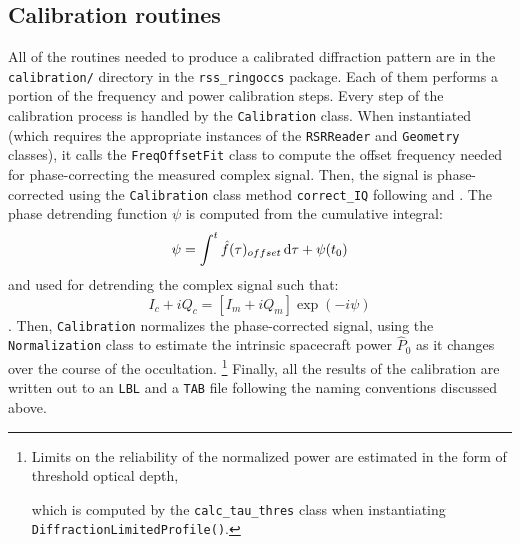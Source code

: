 \documentclass[titlepage, 12pt]{article}
\begin{document}
    \subsection{Calibration routines}\label{sec:calroutines}
            All of the routines needed to produce a calibrated diffraction
            pattern are in the \texttt{calibration/} directory in the
            \texttt{rss\_ringoccs} package. Each of them performs a
            portion of the frequency and power calibration steps. Every step
            of the calibration process is handled by the \texttt{Calibration}
            class. When instantiated (which requires the appropriate instances
            of the \texttt{RSRReader} and \texttt{Geometry} classes), it calls
            the \texttt{FreqOffsetFit} class to compute the offset frequency
            needed for phase-correcting the measured complex signal. Then, the
            signal is phase-corrected using the \texttt{Calibration} class
            method \texttt{correct\_IQ} following \citet{Marouf1986} and
            \citet{CRSUG2018}. The phase detrending function $\psi$ is
            computed from the cumulative integral:
            \begin{equation}
                \psi=\int^{t}\hat{f}(\tau)_{offset}\mathop{}\!\mathrm{d}{\tau}+\psi(t_0)
            \end{equation}
            and used for detrending the complex signal such that:
            \begin{equation}
                I_{c}+iQ_{c}=[I_{m}+iQ_{m}]\exp(-i\psi)
            \end{equation}
            \citep[Equations 17 and 18]{CRSUG2018}.
            Then, \texttt{Calibration} normalizes the phase-corrected signal,
            using the \texttt{Normalization} class to estimate the intrinsic
            spacecraft power $\hat{P}_0$ as it changes over the course of the
            occultation.%
            \footnote{Limits on the reliability of the normalized
                      power are estimated in the form of threshold
                      optical depth,
                      \par\hspace{1.3ex}
                      which is computed by the
                      \texttt{calc\_tau\_thres} class when instantiating
                      \texttt{DiffractionLimitedProfile()}.}
            Finally, all the results of the calibration are written out to
            an \texttt{LBL} and a \texttt{TAB} file following the naming
            conventions discussed above.
\end{document}
